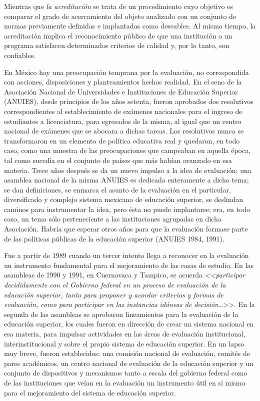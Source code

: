  
 Mientras que \textit{la acreditación} se trata
de un procedimiento cuyo objetivo es comparar el grado de acercamiento del
objeto analizado con un conjunto de normas previamente definidas e
implantadas como deseables. Al mismo tiempo, la acreditación implica el
reconocimiento público de que una institución o un programa satisfacen
determinados criterios de calidad y, por lo tanto, son confiables.

\begin{sloppypar} 
En México hay una
preocupación temprana por la evaluación, no correspondida con acciones,
disposiciones y planteamientos hechos rea\-li\-dad. En el seno de la Asociación
Nacional de Universidades e Instituciones de Educación Superior (ANUIES),
desde principios de los años setenta, fueron aprobados dos resolutivos
correspondientes al establecimiento de exámenes nacionales para el ingreso
de estudiantes a licenciatura, para egresados de la misma, al igual que un
centro nacional de exámenes que se abocara a dichas tareas. Los resolutivos
nunca se transformaron en un elemento de política educativa real y
quedaron, en todo caso, como una muestra de las preocupaciones que
campeaban en aquella época, tal como sucedía en el conjunto de países que
más habían avanzado en esa materia. Trece años después se da un nuevo
impulso a la idea de evaluación; una asamblea nacional de la misma ANUIES
es dedicada enteramente a dicho tema; se dan definiciones, se enmarca el
asunto de la evaluación en el particular, diversificado y complejo sistema
mexicano de educación superior, se deslindan caminos para instrumentar la
idea, pero ésta no puede implantarse; era, en todo caso, un tema sólo
perteneciente a las instituciones agrupadas en dicha Asociación. Habría que
esperar otros años para que la evaluación formase parte de las políticas
públicas de la educación superior (ANUIES 1984, 1991).
\end{sloppypar}

\enlargethispage{1\baselineskip} 
Fue a partir de 1989
cuando un tercer intento llega a reconocer en la evaluación un instrumento
fundamental para el mejoramiento de las casas de estudio. En las asambleas
de 1990 y 1991, en Cuernavaca y Tampico, se acuerda
\textit{<<participar
decididamente con el Gobierno federal en un proceso de evaluación de la
educación superior, tanto para proponer y acordar criterios y formas de
evaluación, como para participar en las instancias idóneas de
decisión\ldots}>>. En la
segunda de las asambleas se aprobaron lineamientos para la evaluación de la
educación superior, los cuales fueron en dirección de crear un sistema
nacional en esa materia, para impulsar actividades en las áreas de
evaluación institucional, interinstitucional y sobre el propio sistema de
educación superior. En un lapso muy breve, fueron establecidos: una
comisión nacional de evaluación, comités de pares académicos, un centro
nacional de evaluación de la educación superior y un conjunto de
dispositivos y mecanismos tanto a escala del gobierno federal como de las
instituciones que veían en la evaluación un instrumento útil en sí mismo
para el mejoramiento del sistema de educación superior.

